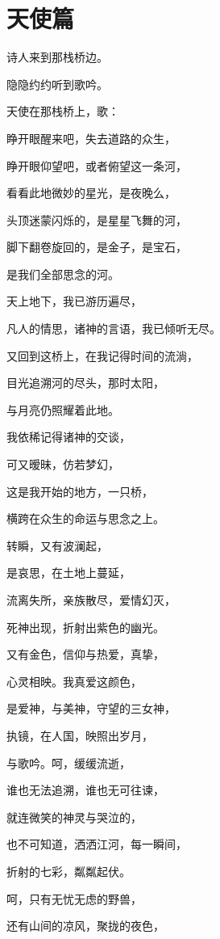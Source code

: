 \documentclass[UTF8]{article}
\begin{document}
\section{天使篇}
\par 诗人来到那栈桥边。
\par 隐隐约约听到歌吟。
\\[0.6cm]
\par 天使在那栈桥上，歌：
\\[0.6cm]
\par 睁开眼醒来吧，失去道路的众生，
\par 睁开眼仰望吧，或者俯望这一条河，
\par 看看此地微妙的星光，是夜晚么，
\par 头顶迷蒙闪烁的，是星星飞舞的河，
\par 脚下翻卷旋回的，是金子，是宝石，
\par 是我们全部思念的河。
\par 天上地下，我已游历遍尽，
\par 凡人的情思，诸神的言语，我已倾听无尽。
\par 又回到这桥上，在我记得时间的流淌，
\par 目光追溯河的尽头，那时太阳，
\par 与月亮仍照耀着此地。
\par 我依稀记得诸神的交谈，
\par 可又暧昧，仿若梦幻，
\par 这是我开始的地方，一只桥，
\par 横跨在众生的命运与思念之上。
\par 转瞬，又有波澜起，
\par 是哀思，在土地上蔓延，
\par 流离失所，亲族散尽，爱情幻灭，
\par 死神出现，折射出紫色的幽光。
\par 又有金色，信仰与热爱，真挚，
\par 心灵相映。我真爱这颜色，
\par 是爱神，与美神，守望的三女神，
\par 执镜，在人国，映照出岁月，
\par 与歌吟。呵，缓缓流逝，
\par 谁也无法追溯，谁也无可往谏，
\par 就连微笑的神灵与哭泣的，
\par 也不可知道，洒洒江河，每一瞬间，
\par 折射的七彩，粼粼起伏。
\par 呵，只有无忧无虑的野兽，
\par 还有山间的凉风，聚拢的夜色，
\end{document}
